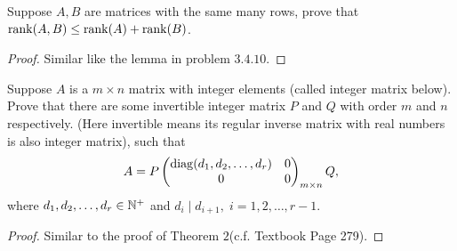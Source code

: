 \begin{pro}%
	Suppose $A, B$ are matrices with the same many rows, prove that $\operatorname*{rank}(A,B)\leq \operatorname*{rank}(A)+\operatorname*{rank}(B)$.
\end{pro}
\begin{proof}
	Similar like the lemma in problem $3.4.10$.
\end{proof}

\begin{pro}%
	Suppose $A$ is a $m\times n$ matrix with integer elements (called integer matrix below). Prove that there are some invertible integer matrix $P$ and $Q$ with order $m$ and $n$ respectively. (Here invertible means its regular inverse matrix with real numbers is also integer matrix), such that
	\[A=P\begin{pmatrix}\operatorname*{diag}(d_1,d_2,\dots,d_r) & 0\\ 0 & 0\end{pmatrix}_{m\times n}Q,\]
	where $d_1,d_2,\dots,d_r\in \mathbb{N}^+$ and $d_i\mid d_{i+1},\;i=1,2,\dots,r-1$.
\end{pro}
\begin{proof}
	Similar to the proof of Theorem $2$(c.f. Textbook Page 279).
\end{proof}

